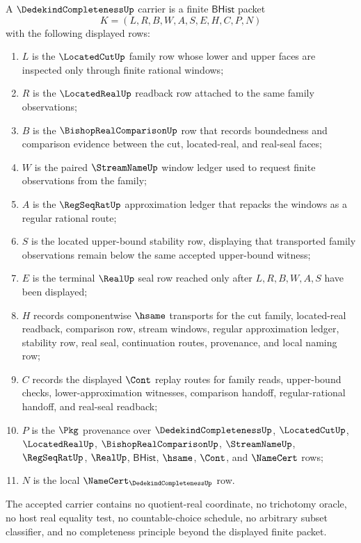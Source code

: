 \begin{definition}
\label{def:dedekind-completeness-carrier}
A $\DedekindCompletenessUp$ carrier is a finite $\mathsf{BHist}$ packet
$$
K=(L,R,B,W,A,S,E,H,C,P,N)
$$
with the following displayed rows:
\begin{enumerate}
\item $L$ is the $\LocatedCutUp$ family row whose lower and upper faces are inspected only through finite rational windows;
\item $R$ is the $\LocatedRealUp$ readback row attached to the same family observations;
\item $B$ is the $\BishopRealComparisonUp$ row that records boundedness and comparison evidence between the cut, located-real, and real-seal faces;
\item $W$ is the paired $\StreamNameUp$ window ledger used to request finite observations from the family;
\item $A$ is the $\RegSeqRatUp$ approximation ledger that repacks the windows as a regular rational route;
\item $S$ is the located upper-bound stability row, displaying that transported family observations remain below the same accepted upper-bound witness;
\item $E$ is the terminal $\RealUp$ seal row reached only after $L,R,B,W,A,S$ have been displayed;
\item $H$ records componentwise $\hsame$ transports for the cut family, located-real readback, comparison row, stream windows, regular approximation ledger, stability row, real seal, continuation routes, provenance, and local naming row;
\item $C$ records the displayed $\Cont$ replay routes for family reads, upper-bound checks, lower-approximation witnesses, comparison handoff, regular-rational handoff, and real-seal readback;
\item $P$ is the $\Pkg$ provenance over $\DedekindCompletenessUp$, $\LocatedCutUp$, $\LocatedRealUp$, $\BishopRealComparisonUp$, $\StreamNameUp$, $\RegSeqRatUp$, $\RealUp$, $\mathsf{BHist}$, $\hsame$, $\Cont$, and $\NameCert$ rows;
\item $N$ is the local $\NameCert_{\DedekindCompletenessUp}$ row.
\end{enumerate}
The accepted carrier contains no quotient-real coordinate, no trichotomy oracle, no host real equality test, no countable-choice schedule, no arbitrary subset classifier, and no completeness principle beyond the displayed finite packet.
\end{definition}

